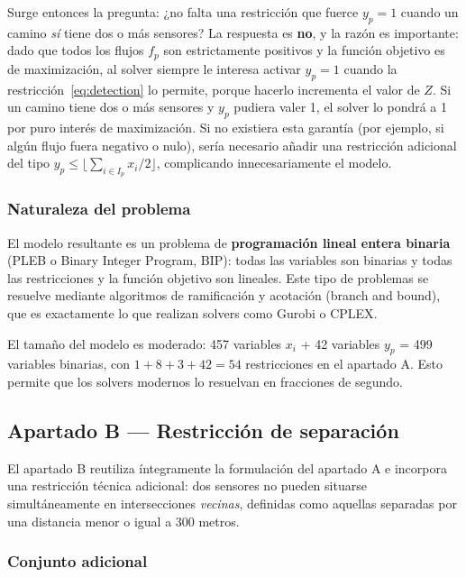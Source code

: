 \documentclass[12pt,a4paper]{article}
\begin{document}
Surge entonces la pregunta: ¿no falta una restricción que fuerce $y_p = 1$ cuando un camino \emph{sí} tiene dos o más sensores? La respuesta es \textbf{no}, y la razón es importante: dado que todos los flujos $f_p$ son estrictamente positivos y la función objetivo es de maximización, al solver siempre le interesa activar $y_p = 1$ cuando la restricción~\eqref{eq:detection} lo permite, porque hacerlo incrementa el valor de $Z$. Si un camino tiene dos o más sensores y $y_p$ pudiera valer 1, el solver lo pondrá a 1 por puro interés de maximización. Si no existiera esta garantía (por ejemplo, si algún flujo fuera negativo o nulo), sería necesario añadir una restricción adicional del tipo $y_p \leq \lfloor\sum_{i \in I_p} x_i / 2\rfloor$, complicando innecesariamente el modelo.

\subsubsection{Naturaleza del problema}

El modelo resultante es un problema de \textbf{programación lineal entera binaria} (PLEB o Binary Integer Program, BIP): todas las variables son binarias y todas las restricciones y la función objetivo son lineales. Este tipo de problemas se resuelve mediante algoritmos de ramificación y acotación (branch and bound), que es exactamente lo que realizan solvers como Gurobi o CPLEX.

El tamaño del modelo es moderado: 457 variables $x_i$ + 42 variables $y_p$ = 499 variables binarias, con $1 + 8 + 3 + 42 = 54$ restricciones en el apartado A. Esto permite que los solvers modernos lo resuelvan en fracciones de segundo.

\subsection{Apartado B --- Restricción de separación}

El apartado B reutiliza íntegramente la formulación del apartado A e incorpora una restricción técnica adicional: dos sensores no pueden situarse simultáneamente en intersecciones \emph{vecinas}, definidas como aquellas separadas por una distancia menor o igual a 300 metros.

\subsubsection{Conjunto adicional}
\end{document}
